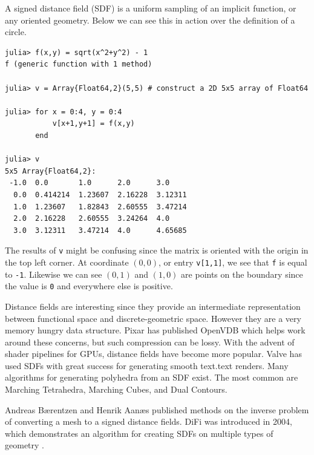 
A signed distance field (SDF) is a uniform sampling of an implicit function,
or any oriented geometry. 
Below
we can see this in action over the definition of a circle.

\begin{lstlisting}
julia> f(x,y) = sqrt(x^2+y^2) - 1
f (generic function with 1 method)

julia> v = Array{Float64,2}(5,5) # construct a 2D 5x5 array of Float64

julia> for x = 0:4, y = 0:4
           v[x+1,y+1] = f(x,y)
       end

julia> v
5x5 Array{Float64,2}:
 -1.0  0.0       1.0      2.0      3.0    
  0.0  0.414214  1.23607  2.16228  3.12311
  1.0  1.23607   1.82843  2.60555  3.47214
  2.0  2.16228   2.60555  3.24264  4.0    
  3.0  3.12311   3.47214  4.0      4.65685
\end{lstlisting}

The results of \texttt{v} might be confusing since the matrix is oriented with
the origin in the top left corner. At coordinate $(0,0)$, or entry \texttt{v[1,1]},
we see that \texttt{f} is
equal to \texttt{-1}. Likewise we can see $(0,1)$ and $(1,0)$ are points on
the boundary since the value is \texttt{0} and everywhere else is positive.

Distance fields are interesting since they provide an intermediate representation
between functional space and discrete-geometric space. However they are
a very memory hungry data structure. Pixar has published OpenVDB which helps
work around these concerns, but such compression can be lossy.\cite{OpenVDB}
With the advent of shader pipelines for GPUs, distance fields have become
more popular. Valve has used SDFs with great success for generating smooth
text.text renders. \cite{Green_2007}
Many algorithms for generating polyhedra from an SDF
exist. The most common are Marching Tetrahedra, Marching Cubes,
and Dual Contours.\cite{Muller_Wehle_1997}\cite{Newman_Yi_2006}\cite{Cook_Hourvitz}


Andreas Bærentzen and Henrik Aanæs published methods on the inverse
problem of converting a mesh to a signed distance fields.\cite{Baerentzen_Aanaes}
DiFi was introduced in 2004, which demonstrates an algorithm for creating
SDFs on multiple types of geometry \cite{Sud_Otaduy_Manocha_2004}.

